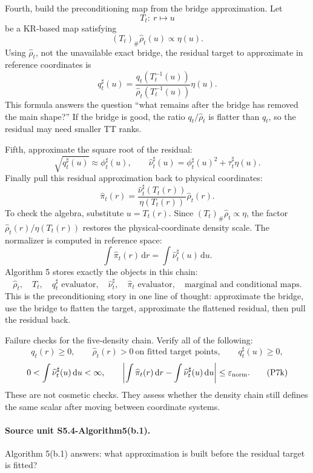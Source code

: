 \documentclass[11pt]{article}
\newcommand{\dd}{\,\mathrm d}
\begin{document}
Fourth, build the preconditioning map from the bridge approximation.  Let
\[
    T_t:\ r\mapsto u
    \tag{P7c}
\]
be a KR-based map satisfying
\[
    (T_t)_\#\widehat\rho_t(u)\propto \eta(u).
    \tag{P7d}
\]
Using \(\widehat\rho_t\), not the unavailable exact bridge, the residual target
to approximate in reference coordinates is
\[
    q_t^\sharp(u)
    =
    \frac{q_t(T_t^{-1}(u))}
    {\widehat\rho_t(T_t^{-1}(u))}
    \eta(u).
    \tag{P7e}
\]
This formula answers the question ``what remains after the bridge has removed
the main shape?''  If the bridge is good, the ratio \(q_t/\widehat\rho_t\) is
flatter than \(q_t\), so the residual may need smaller TT ranks.

Fifth, approximate the square root of the residual:
\[
    \sqrt{q_t^\sharp(u)}\approx \phi_t^\sharp(u),
    \qquad
    \widehat\nu_t^\sharp(u)
    =
    \phi_t^\sharp(u)^2+\tau_t^\sharp\eta(u).
    \tag{P7f}
\]
Finally pull this residual approximation back to physical coordinates:
\[
    \widehat\pi_t(r)
    =
    \frac{\widehat\nu_t^\sharp(T_t(r))}
    {\eta(T_t(r))}
    \widehat\rho_t(r).
    \tag{P7g}
\]
To check the algebra, substitute \(u=T_t(r)\).  Since
\((T_t)_\#\widehat\rho_t\propto\eta\), the factor
\(\widehat\rho_t(r)/\eta(T_t(r))\) restores the physical-coordinate density
scale.  The normalizer is computed in reference space:
\[
    \int \widehat\pi_t(r)\dd r
    =
    \int \widehat\nu_t^\sharp(u)\dd u.
    \tag{P7h}
\]
Algorithm 5 stores exactly the objects in this chain:
\[
    \widehat\rho_t,\quad T_t,\quad q_t^\sharp\text{ evaluator},\quad
    \widehat\nu_t^\sharp,\quad \widehat\pi_t\text{ evaluator},\quad
    \text{marginal and conditional maps}.
    \tag{P7i}
\]
This is the preconditioning story in one line of thought: approximate the
bridge, use the bridge to flatten the target, approximate the flattened
residual, then pull the residual back.

Failure checks for the five-density chain.  Verify all of the following:
\[
    q_t(r)\ge0,\qquad
    \widehat\rho_t(r)>0\ \text{on fitted target points},\qquad
    q_t^\sharp(u)\ge0,
    \tag{P7j}
\]
\[
    0<\int\widehat\nu_t^\sharp(u)\dd u<\infty,\qquad
    \left|
    \int\widehat\pi_t(r)\dd r-\int\widehat\nu_t^\sharp(u)\dd u
    \right|
    \le \varepsilon_{\rm norm}.
    \tag{P7k}
\]
These are not cosmetic checks.  They assess whether the density chain still
defines the same scalar after moving between coordinate systems.

\paragraph{Source unit S5.4-Algorithm5(b.1).}
Algorithm 5(b.1) answers: what approximation is built before the residual
target is fitted?
\end{document}
